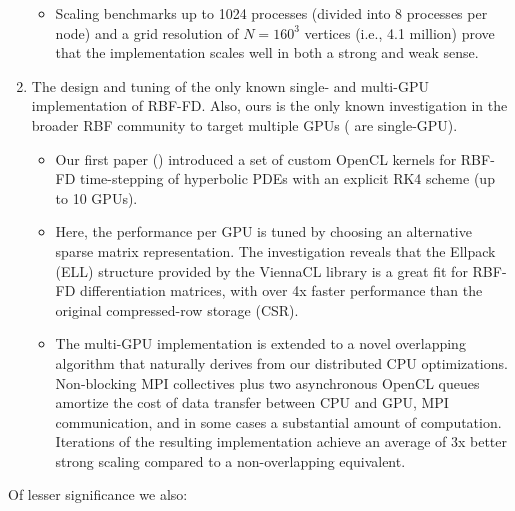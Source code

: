 \documentclass[11pt]{report}
\begin{document}
\begin{enumerate}
\begin{itemize}
\item Scaling benchmarks up to 1024 processes (divided into 8 processes per node) and a grid resolution of $N=160^3$ vertices (i.e., 4.1 million) prove that the implementation scales well in both a strong and weak sense. 
\end{itemize} 
\item The design and tuning of the only known single- and multi-GPU implementation of RBF-FD. Also, ours is the only known investigation in the broader RBF community to target multiple GPUs (\cite{Schmidt2009a,Cuomo2013} are single-GPU). 
\begin{itemize} 
\item Our first paper (\cite{BolligFlyerErlebacher2012}) introduced a set of custom OpenCL kernels for RBF-FD time-stepping of hyperbolic PDEs with an explicit RK4 scheme (up to 10 GPUs). 
\item Here, the performance per GPU is tuned by choosing an alternative sparse matrix representation. The investigation reveals that the Ellpack (ELL) structure provided by the ViennaCL library \cite{Rupp2010} is a great fit for RBF-FD differentiation matrices, with over 4x faster performance than the original compressed-row storage (CSR). %
\item The multi-GPU implementation is extended to a novel overlapping algorithm that naturally derives from our distributed CPU optimizations. Non-blocking MPI collectives plus two asynchronous OpenCL queues amortize the cost of data transfer between CPU and GPU, MPI communication, and in some cases a substantial amount of computation. Iterations of the resulting implementation achieve an average of 3x better strong scaling compared to a non-overlapping equivalent. 
\end{itemize} 
\end{enumerate}
Of lesser significance we also: 
\end{document}
